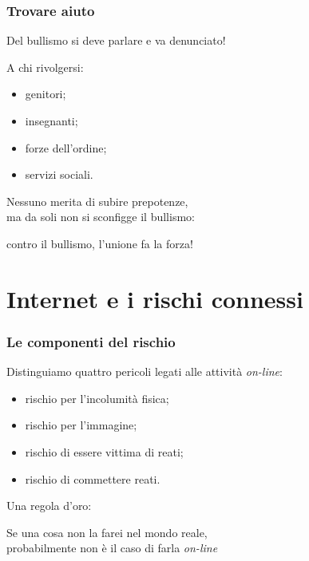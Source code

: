 \documentclass[13pt]{beamer}
\begin{document}
	\begin{frame}
		\frametitle{Trovare aiuto}	
		Del bullismo si deve parlare e va denunciato!
		
		A chi rivolgersi:
		\begin{itemize}
			\item genitori;
			\item insegnanti;
			\item forze dell'ordine;
			\item servizi sociali.
		\end{itemize}
	\end{frame}
	
	\begin{frame}[standout]
		Nessuno merita di subire prepotenze, \\ ma da soli non si sconfigge il bullismo:


		\alert{contro il bullismo, l'unione fa la forza!}
		
	\end{frame}

%		

	\section{Internet e i rischi connessi}
	\begin{frame}
		\frametitle{Le componenti del rischio}
		Distinguiamo quattro pericoli legati alle attività \textit{on-line}:
		\begin{itemize}
			\item rischio per l'incolumità fisica;
			\onslide<3->\item rischio per l'immagine;
			\onslide<4->\item rischio di essere vittima di reati;
			\onslide<5>\item rischio di commettere reati.
		\end{itemize}
	\end{frame}

	\begin{frame}[standout]
		Una regola d'oro:
	
		\alert{Se una cosa non la farei nel mondo reale,\\
		probabilmente non è il caso di farla \textit{on-line}}
		
	\end{frame}
\end{document}
